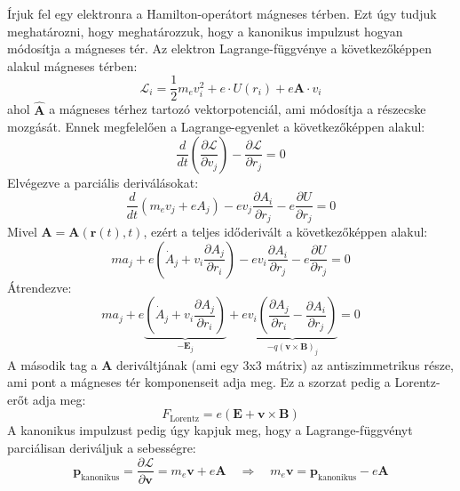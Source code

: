 \documentclass[../main.tex]{subfiles}
\begin{document}
Írjuk fel egy elektronra a Hamilton-operátort mágneses térben. Ezt úgy tudjuk meghatározni, hogy meghatározzuk, hogy a kanonikus impulzust hogyan módosítja a mágneses tér.
Az elektron Lagrange-függvénye a következőképpen alakul mágneses térben:
\begin{equation}
    \mathcal{L}_i = \frac{1}{2} m_e v_i^2 + e \cdot U(r_i) + e \mathbf{A} \cdot v_i
\end{equation}
ahol $\hat{\mathbf{A}}$ a mágneses térhez tartozó vektorpotenciál, ami módosítja a részecske mozgását. Ennek megfelelően a Lagrange-egyenlet a következőképpen alakul:
\begin{equation}
    \frac{d}{dt} \left( \frac{\partial \mathcal{L}}{\partial v_j} \right) - \frac{\partial \mathcal{L}}{\partial r_j} = 0
\end{equation}
Elvégezve a parciális deriválásokat:
\begin{equation}
   \frac{d}{dt} \left( m_e v_j + e A_j \right) - e v_j \frac{\partial A_i}{\partial r_j} - e \frac{\partial U}{\partial r_j} = 0 
\end{equation}
Mivel $\mathbf{A} = \mathbf{A}(\mathbf{r}(t),t)$, ezért a teljes időderivált a következőképpen alakul:
\begin{equation}
    m a_j + e \left(\dot{A}_j + v_i \frac{\partial A_j}{\partial r_i}\right) - e v_i \frac{\partial A_i}{\partial r_j} - e \frac{\partial U}{\partial r_j} = 0
\end{equation}
Átrendezve:
\begin{equation}
    m a_j + e \underbrace{\left(\dot{A}_j + v_i \frac{\partial A_j}{\partial r_i}\right)}_{-\mathbf{E}_j} + e \underbrace{v_i \left(\frac{\partial A_j}{\partial r_i} - \frac{\partial A_i}{\partial r_j}\right)}_{-q (\mathbf{v} \times \mathbf{B})_j} = 0
\end{equation}
A második tag a $\mathbf{A}$ deriváltjának (ami egy 3x3 mátrix) az antiszimmetrikus része, ami pont a mágneses tér komponenseit adja meg. Ez a szorzat pedig a Lorentz-erőt adja meg:
\begin{equation}
    F_{\text{Lorentz}} = e \left(\mathbf{E} + \mathbf{v} \times \mathbf{B}\right)
\end{equation}
A kanonikus impulzust pedig úgy kapjuk meg, hogy a Lagrange-függvényt parciálisan deriváljuk a sebességre:
\begin{equation}
    \mathbf{p}_{\text{kanonikus}} = \frac{\partial \mathcal{L}}{\partial \mathbf{v}} = m_e \mathbf{v} + e \mathbf{A} \quad \Rightarrow \quad m_e \mathbf{v} = \mathbf{p}_{\text{kanonikus}} - e \mathbf{A}
\end{equation}
\end{document}
